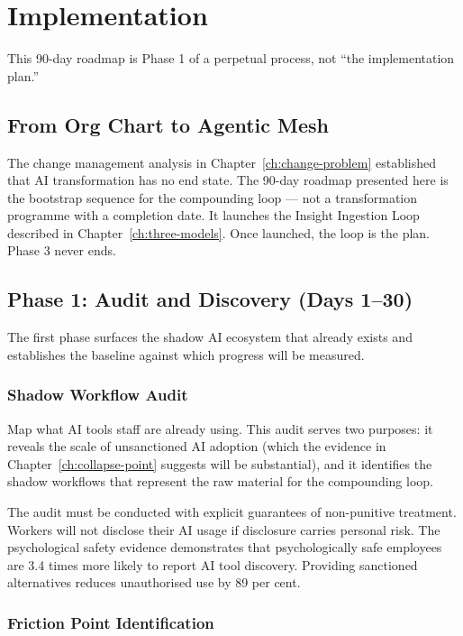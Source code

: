 \chapter{Implementation}
\label{ch:implementation}

\epigraph{This 90-day roadmap is Phase 1 of a perpetual process, not ``the implementation plan.''}{}

\section{From Org Chart to Agentic Mesh}

The change management analysis in Chapter~\ref{ch:change-problem} established that AI transformation has no end state. The 90-day roadmap presented here is the bootstrap sequence for the compounding loop --- not a transformation programme with a completion date. It launches the Insight Ingestion Loop described in Chapter~\ref{ch:three-models}. Once launched, the loop is the plan. Phase 3 never ends.

\section{Phase 1: Audit and Discovery (Days 1--30)}

The first phase surfaces the shadow AI ecosystem that already exists and establishes the baseline against which progress will be measured.

\subsection{Shadow Workflow Audit}

Map what AI tools staff are already using. This audit serves two purposes: it reveals the scale of unsanctioned AI adoption (which the evidence in Chapter~\ref{ch:collapse-point} suggests will be substantial), and it identifies the shadow workflows that represent the raw material for the compounding loop.

The audit must be conducted with explicit guarantees of non-punitive treatment. Workers will not disclose their AI usage if disclosure carries personal risk. The psychological safety evidence \parencite{EdmondsonLei2025} demonstrates that psychologically safe employees are 3.4 times more likely to report AI tool discovery. Providing sanctioned alternatives reduces unauthorised use by 89 per cent.

\subsection{Friction Point Identification}

